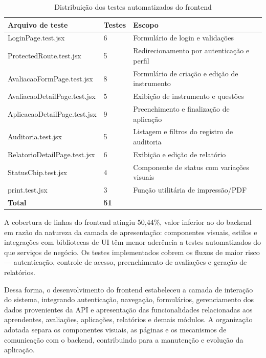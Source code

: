 \begin{table}[H]
\centering
\small
\begin{tabular}{p{6cm} p{3cm} p{4.5cm}}
\hline
\textbf{Arquivo de teste} & \textbf{Testes} & \textbf{Escopo} \\
\hline
LoginPage.test.jsx & 6 & Formulário de login e validações \\
ProtectedRoute.test.jsx & 5 & Redirecionamento por autenticação e perfil \\
AvaliacaoFormPage.test.jsx & 8 & Formulário de criação e edição de instrumento \\
AvaliacaoDetailPage.test.jsx & 5 & Exibição de instrumento e questões \\
AplicacaoDetailPage.test.jsx & 9 & Preenchimento e finalização de aplicação \\
Auditoria.test.jsx & 5 & Listagem e filtros do registro de auditoria \\
RelatorioDetailPage.test.jsx & 6 & Exibição e edição de relatório \\
StatusChip.test.jsx & 4 & Componente de status com variações visuais \\
print.test.jsx & 3 & Função utilitária de impressão/PDF \\
\hline
\textbf{Total} & \textbf{51} & \\
\hline
\end{tabular}
\caption{Distribuição dos testes automatizados do frontend}
\label{tab:testes_frontend}
\end{table}

A cobertura de linhas do frontend atingiu 50,44\%, valor inferior ao do backend em razão da natureza da camada de apresentação: componentes visuais, estilos e integrações com bibliotecas de UI têm menor aderência a testes automatizados do que serviços de negócio. Os testes implementados cobrem os fluxos de maior risco — autenticação, controle de acesso, preenchimento de avaliações e geração de relatórios.

Dessa forma, o desenvolvimento do frontend estabeleceu a camada de interação do sistema, integrando autenticação, navegação, formulários, gerenciamento dos dados provenientes da API e apresentação das funcionalidades relacionadas aos aprendentes, avaliações, aplicações, relatórios e demais módulos. A organização adotada separa os componentes visuais, as páginas e os mecanismos de comunicação com o backend, contribuindo para a manutenção e evolução da aplicação.
